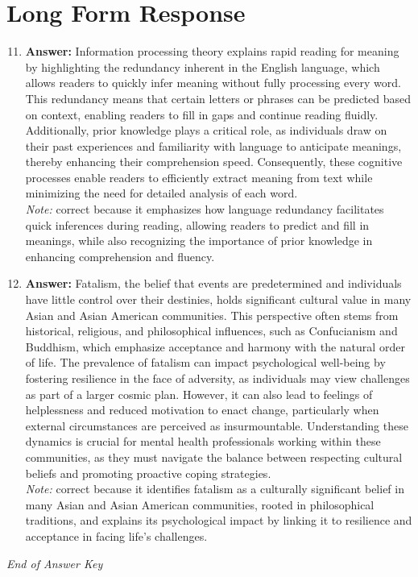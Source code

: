 \documentclass[12pt]{article}
\begin{document}
\section*{Long Form Response}
\begin{enumerate}[label=\arabic*.]
\setcounter{enumi}{10}
\item \textbf{Answer:} Information processing theory explains rapid reading for meaning by highlighting the redundancy inherent in the English language, which allows readers to quickly infer meaning without fully processing every word. This redundancy means that certain letters or phrases can be predicted based on context, enabling readers to fill in gaps and continue reading fluidly. Additionally, prior knowledge plays a critical role, as individuals draw on their past experiences and familiarity with language to anticipate meanings, thereby enhancing their comprehension speed. Consequently, these cognitive processes enable readers to efficiently extract meaning from text while minimizing the need for detailed analysis of each word.
\\ \textit{Note:} correct because it emphasizes how language redundancy facilitates quick inferences during reading, allowing readers to predict and fill in meanings, while also recognizing the importance of prior knowledge in enhancing comprehension and fluency.
\item \textbf{Answer:} Fatalism, the belief that events are predetermined and individuals have little control over their destinies, holds significant cultural value in many Asian and Asian American communities. This perspective often stems from historical, religious, and philosophical influences, such as Confucianism and Buddhism, which emphasize acceptance and harmony with the natural order of life. The prevalence of fatalism can impact psychological well-being by fostering resilience in the face of adversity, as individuals may view challenges as part of a larger cosmic plan. However, it can also lead to feelings of helplessness and reduced motivation to enact change, particularly when external circumstances are perceived as insurmountable. Understanding these dynamics is crucial for mental health professionals working within these communities, as they must navigate the balance between respecting cultural beliefs and promoting proactive coping strategies.
\\ \textit{Note:} correct because it identifies fatalism as a culturally significant belief in many Asian and Asian American communities, rooted in philosophical traditions, and explains its psychological impact by linking it to resilience and acceptance in facing life's challenges.
\end{enumerate}

\vfill
\noindent\textit{End of Answer Key}
\end{document}
